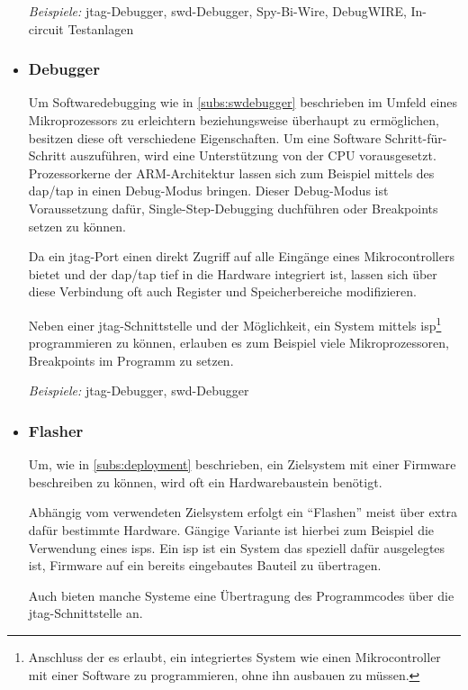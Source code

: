 \begin{itemize}
  \emph{Beispiele:} \gls{jtag}-Debugger, \gls{swd}-Debugger, Spy-Bi-Wire,
  DebugWIRE, In-circuit Testanlagen
  \item \subsubsection*{Debugger}\label{subs:hwdebugger}  Um
  Softwaredebugging wie in \autoref{subs:swdebugger} beschrieben im Umfeld eines
  Mikroprozessors zu erleichtern beziehungsweise überhaupt zu ermöglichen,
  besitzen diese oft verschiedene Eigenschaften.
  Um eine Software Schritt-für-Schritt auszuführen, wird eine Unterstützung von
  der CPU vorausgesetzt. Prozessorkerne der ARM-Architektur lassen sich zum
  Beispiel mittels des \gls{dap}/\gls{tap} in einen Debug-Modus bringen.
  Dieser Debug-Modus ist Voraussetzung dafür, Single-Step-Debugging duchführen
  oder Breakpoints setzen zu können.
  
  Da ein \gls{jtag}-Port einen direkt Zugriff auf alle Eingänge eines
  Mikrocontrollers bietet und der \gls{dap}/\gls{tap} tief in die Hardware
  integriert ist, lassen sich über diese Verbindung oft auch Register und Speicherbereiche modifizieren.
  
  Neben einer \gls{jtag}-Schnittstelle und der Möglichkeit, ein System mittels
  \gls{isp}\footnote{Anschluss der es erlaubt, ein
  integriertes System wie einen Mikrocontroller mit einer Software zu programmieren, ohne
  ihn ausbauen zu müssen.} programmieren zu können, erlauben es zum Beispiel
  viele Mikroprozessoren, Breakpoints im Programm zu setzen.
  
  \emph{Beispiele:} \gls{jtag}-Debugger, \gls{swd}-Debugger
  \item \subsubsection*{Flasher} Um, wie in \autoref{subs:deployment}
  beschrieben, ein Zielsystem mit einer Firmware beschreiben zu können, wird
  oft ein Hardwarebaustein benötigt.
  
  Abhängig vom verwendeten Zielsystem erfolgt ein "`Flashen"' meist über extra
  dafür bestimmte Hardware. Gängige Variante ist hierbei zum Beispiel die
  Verwendung eines \glspl{isp}. Ein \gls{isp}
  ist ein System das speziell dafür ausgelegtes ist, Firmware auf ein bereits
  eingebautes Bauteil zu übertragen.
  
  Auch bieten manche Systeme eine Übertragung des Programmcodes über die
  \gls{jtag}-Schnittstelle an.
\end{itemize}
